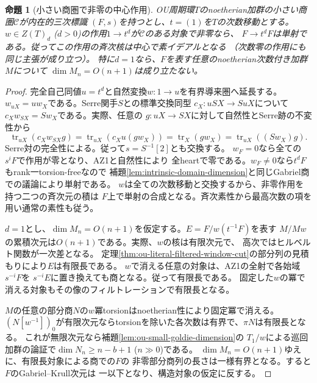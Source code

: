 \documentclass[11pt,a4paper]{ltjsarticle}
\newtheorem{proposition}[theorem]{命題}
\theoremstyle{definition}
\begin{document}
\begin{proposition}[小さい商圏で非零の中心作用]
\label{prop:ou-visible-central-action}
OU周期環$T$のnoetherian加群の小さい商圏$\mathcal C$が内在的三次標識
$(F,s)$を持つとし、$t=(1)$を$T$の次数移動とする。
$w\in Z(T)_d$ ($d>0$)の作用$1\to t^d$が$\mathcal C$のある対象で非零なら、
$F\to t^dF$は単射である。従ってこの作用の斉次核は中心で素イデアルとなる
（次数零の作用にも同じ主張が成り立つ）。
特に$d=1$なら、$F$を表す任意のnoetherian次数付き加群$M$について
$\dim M_n=O(n+1)$は成り立たない。
\end{proposition}
\begin{proof}
完全自己同値$u=t^d$と自然変換$w:1\to u$を有界導来圏へ延長する。
$w_{uX}=u w_X$である。Serre関手$S$との標準交換同型
$c_X:uSX\to SuX$について$c_X w_{SX}=S w_X$である。実際、任意の
$g:uX\to SX$に対して自然性とSerre跡の不変性から
\[
 \operatorname{tr}_{uX}(c_X w_{SX}g)=
 \operatorname{tr}_{uX}(c_X u(gw_X))=
 \operatorname{tr}_X(gw_X)=\operatorname{tr}_{uX}((Sw_X)g).
\]
Serre対の完全性による。従って$s=S^{-1}[2]$とも交換する。
$w_F=0$なら全ての$s^iF$で作用が零となり、AZ1と自然性により
全heartで零である。$w_F\ne0$なら$t^dF$もrank一torsion-freeなので
補題\ref{lem:intrinsic-domain-dimension}と同じGabriel商での議論により単射である。
$w$は全ての次数移動と交換するから、非零作用を持つ二つの斉次元の積は
$F$上で単射の合成となる。斉次素性から最高次数の項を用い通常の素性も従う。

$d=1$とし、$\dim M_n=O(n+1)$を仮定する。$E=F/w(t^{-1}F)$を表す
$M/Mw$の累積次元は$O(n+1)$である。実際、$w$の核は有限次元で、
高次ではヒルベルト関数が一次差となる。
定理\ref{thm:ou-literal-filtered-window-cut}の部分列の見積もりにより$E$は有限長である。
$w$で消える任意の対象は、AZ1の全射で各始域$s^{-i}F$を
$s^{-i}E$に置き換えても商となる。従って有限長である。
固定した$w$の冪で消える対象もその像のフィルトレーションで有限長となる。

$M$の任意の部分商$N$の$w$冪torsionはnoetherian性により固定冪で消える。
$(N[w^{-1}])_0$が有限次元ならtorsionを除いた各次数は有界で、$\pi N$は有限長となる。
これが無限次元なら補題\ref{lem:ou-small-goldie-dimension}の
$T_1/w$による巡回加群の論証で$\dim N_n\ge n-b+1$ ($n\gg0$)である。
$\dim M_n=O(n+1)$ゆえに、有限長対象による商での$F$の
非零部分商列の長さは一様有界となる。すると$F$のGabriel--Krull次元は
一以下となり、構造対象の仮定に反する。
\end{proof}
\end{document}
